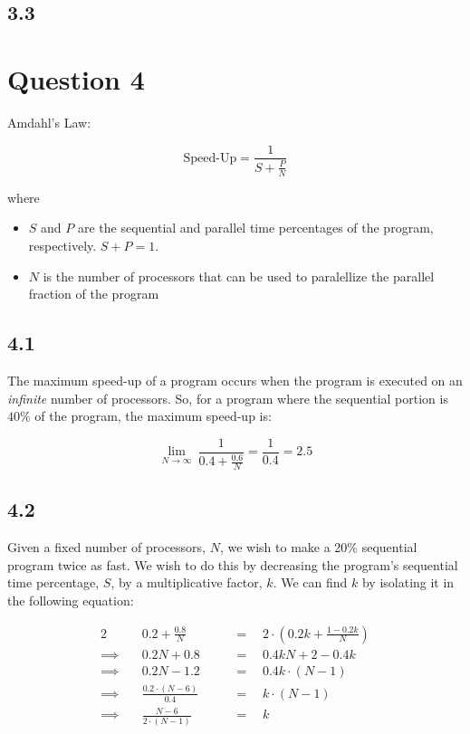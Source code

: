 \documentclass[11pt, letterpaper]{article}
\begin{document}
\subsection*{3.3}
\section*{Question 4}

Amdahl's Law:

$$
\text{Speed-Up} = \frac{1}{S + \frac{P}{N}}
$$

where

\begin{itemize}
    \item $S$ and $P$ are the sequential and parallel time percentages of the program, respectively. $S + P = 1$.
    \item $N$ is the number of processors that can be used to paralellize the parallel fraction of the program
\end{itemize}

\subsection*{4.1}

The maximum speed-up of a program occurs when the program is executed on an \textit{infinite} number of processors. So, for a program where the sequential portion is $40\%$ of the program, the maximum speed-up is:

$$
\lim_{N \to \infty}\ {\frac{1}{0.4 + \frac{0.6}{N}}} = \frac{1}{0.4} = 2.5
$$

\subsection*{4.2}

Given a fixed number of processors, $N$, we wish to make a 20\% sequential program twice as fast. We wish to do this by decreasing the program's sequential time percentage, $S$, by a multiplicative factor, $k$. We can find $k$ by isolating it in the following equation:

\begin{alignat*}{2}
            & \quad 0.2 + \frac{0.8}{N}           \quad &&= \quad 2 \cdot \left(0.2 k + \frac{1 - 0.2 k}{N}\right)\\
    \implies& \quad 0.2N + 0.8                    \quad &&= \quad 0.4kN + 2 - 0.4k\\
    \implies& \quad 0.2N - 1.2                    \quad &&= \quad 0.4k \cdot (N - 1)\\
    \implies& \quad \frac{0.2 \cdot (N - 6)}{0.4} \quad &&= \quad k \cdot (N - 1)\\
    \implies& \quad \frac{N - 6}{2 \cdot (N - 1)} \quad &&= \quad k\\
\end{alignat*}
\end{document}
